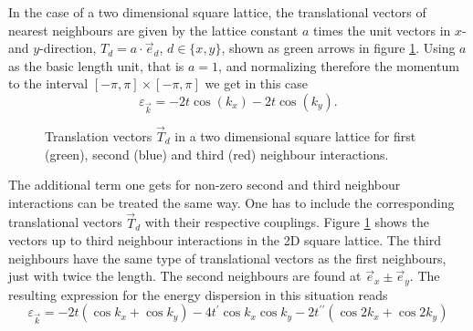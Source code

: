 In the case of a two dimensional square lattice, the translational vectors of nearest neighbours are given by the lattice constant $a$ times the unit vectors in 
$x$- and $y$-direction, $T_d = a\cdot \vec{e}_d$, $ d \in \{x,y\}$, shown as green arrows in figure \ref{2d_square}.
Using $a$ as the basic length unit, that is $a=1$, 
and normalizing therefore the momentum to the interval $[-\pi,\pi]\times [-\pi,\pi]$ 
we get in this case
\begin{equation}
\varepsilon_{\vec k} = -2t\cos(k_x)-2t\cos(k_y). 
\end{equation}



\begin{figure}
\begin{center}
\end{center}
\caption{Translation vectors $\vec T_d$ in a two dimensional square lattice for first (green), second (blue) and third (red) neighbour interactions.}
\label{2d_square}
\end{figure}

The additional term one gets for non-zero second and third neighbour interactions can be treated the same way. 
One has to include the corresponding translational vectors $\vec T_d$ with their respective couplings.
Figure \ref{2d_square} shows the vectors up to third neighbour interactions in the 2D square lattice.
The third neighbours have the same type of translational vectors as the first neighbours, just with twice the length.
The second neighbours are found at $\vec e_x \pm \vec e_y$.
The resulting expression for the energy dispersion in this situation reads
\begin{equation}
 \varepsilon_{\vec k } = -2t \left(\cos k_x + \cos k_y \right) -4t^{\prime} \cos k_x \cos k_y  -2t^{\prime \prime} \left( \cos 2k_x + \cos 2k_y \right)
\end{equation}

